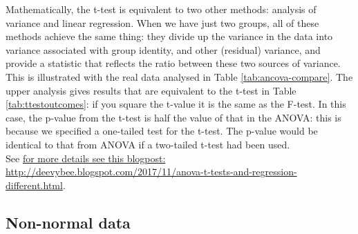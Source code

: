 \documentclass{krantz}
\begin{document}
\begin{tcolorbox}[colback=Black!5!lightgray,colframe=black!75!black,coltitle=white,title= {Analysis of variance,  linear regression and t-test}]
Mathematically, the t-test is equivalent to two other methods: analysis of variance and linear regression. When we have just two groups, all of these methods achieve the same thing: they divide up the variance in the data into variance associated with group identity, and other (residual) variance, and provide a statistic that reflects the ratio between these two sources of variance. This is illustrated with the real data analysed in Table \ref{tab:ancova-compare}. The upper analysis gives results that are equivalent to the t-test in Table \ref{tab:ttestoutcomes}: if you square the t-value it is the same as the F-test. In this case, the p-value from the t-test is half the value of that in the ANOVA: this is because we specified a one-tailed test for the t-test. The p-value would be identical to that from ANOVA if a two-tailed t-test had been used.\\
See \href{http://deevybee.blogspot.com/2017/11/anova-t-tests-and-regression-different.html}{for more details see this blogpost: http://deevybee.blogspot.com/2017/11/anova-t-tests-and-regression-different.html}.
\end{tcolorbox}

\hypertarget{non-normal-data}{%
\subsection{Non-normal data}\label{non-normal-data}}
\end{document}
